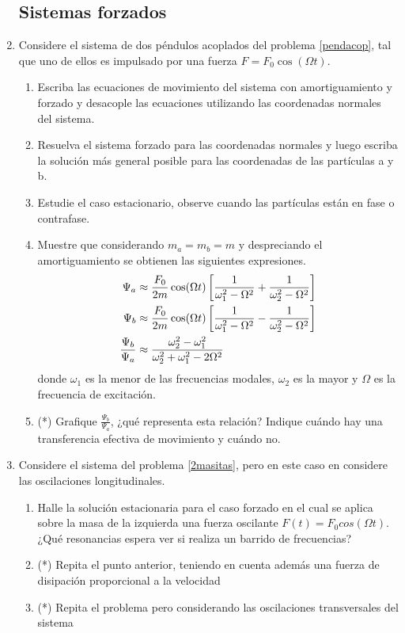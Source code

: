 \documentclass[11pt,spanish,a4paper]{article}
\begin{document}
\begin{enumerate}
\subsection*{Sistemas forzados}
\item Considere el sistema de dos péndulos acoplados del problema \ref{pendacop}, tal que uno de ellos es impulsado por una fuerza $F= F_0 \cos(\Omega t)$.  
\begin{enumerate}
	\item Escriba las ecuaciones de movimiento del sistema con amortiguamiento y forzado y desacople las ecuaciones utilizando las coordenadas normales del sistema.
	\item Resuelva el sistema forzado para las coordenadas normales y luego escriba la solución más general posible para las coordenadas de las partículas a y b.
	\item Estudie el caso estacionario, observe cuando las partículas están en fase o contrafase.
	\item Muestre que considerando $m_a= m_b= m$ y despreciando el amortiguamiento se obtienen las siguientes expresiones.
		\begin{align}
			\Psi_a &\approx \frac{F_0}{2m} \cos(\Omega t) \left[ \frac{1}{\omega_1^2 - \Omega^2 } + \frac{1}{\omega_2^2 -\Omega^2} \right] \notag \\
			\Psi_b &\approx \frac{F_0}{2m} \cos(\Omega t) \left[ \frac{1}{\omega_1^2 - \Omega^2 } - \frac{1}{\omega_2^2 -\Omega^2} \right] \notag \\
			\frac{\Psi_b}{\Psi_a} &\approx \frac{\omega_2^2 - \omega_1^2}{\omega_2^2 + \omega_1^2 - 2 \Omega^2} \notag
		\end{align}
	donde $\omega_{1}$ es la menor de las frecuencias modales, $\omega_{2}$ es la mayor y $\Omega$ es la frecuencia de excitación.
	\item (*) Grafique $\frac{\Psi_b}{\Psi_a}$, ¿qué representa esta relación?
	Indique cuándo hay una transferencia efectiva de movimiento y cuándo no.
\end{enumerate}


\item Considere el sistema del problema \ref{2masitas}, pero en este caso en considere las oscilaciones longitudinales.
\begin{enumerate}
    \item Halle la solución estacionaria para el caso forzado en el cual se aplica sobre la masa de la izquierda una fuerza oscilante $F(t)= F_0 cos(\Omega t)$.
		¿Qué resonancias espera ver si realiza un barrido de frecuencias?
		\item (*) Repita el punto anterior, teniendo en cuenta además una fuerza de disipación proporcional a la velocidad
		\item (*) Repita el problema pero considerando las oscilaciones transversales del sistema
\end{enumerate}


\end{enumerate}
\end{document}
